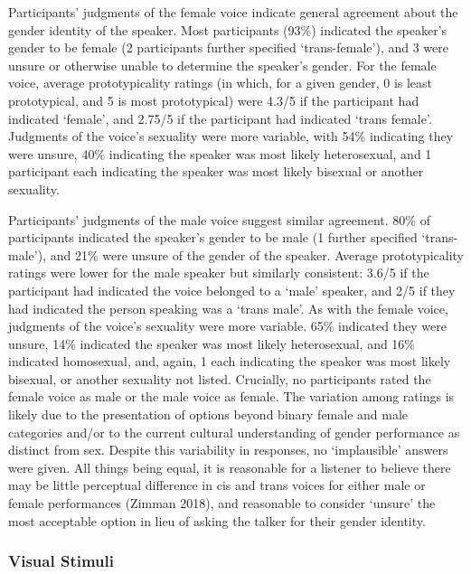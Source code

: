 \documentclass[
  letterpaper,
  DIV=11,
  numbers=noendperiod]{scrartcl}
\begin{document}
Participants' judgments of the female voice indicate general agreement
about the gender identity of the speaker. Most participants (93\%)
indicated the speaker's gender to be female (2 participants further
specified `trans-female'), and 3 were unsure or otherwise unable to
determine the speaker's gender. For the female voice, average
prototypicality ratings (in which, for a given gender, 0 is least
prototypical, and 5 is most prototypical) were 4.3/5 if the participant
had indicated `female', and 2.75/5 if the participant had indicated
`trans female'. Judgments of the voice's sexuality were more variable,
with 54\% indicating they were unsure, 40\% indicating the speaker was
most likely heterosexual, and 1 participant each indicating the speaker
was most likely bisexual or another sexuality.

Participants' judgments of the male voice suggest similar agreement.
80\% of participants indicated the speaker's gender to be male (1
further specified `trans-male'), and 21\% were unsure of the gender of
the speaker. Average prototypicality ratings were lower for the male
speaker but similarly consistent: 3.6/5 if the participant had indicated
the voice belonged to a `male' speaker, and 2/5 if they had indicated
the person speaking was a `trans male'. As with the female voice,
judgments of the voice's sexuality were more variable. 65\% indicated
they were unsure, 14\% indicated the speaker was most likely
heterosexual, and 16\% indicated homosexual, and, again, 1 each
indicating the speaker was most likely bisexual, or another sexuality
not listed. Crucially, no participants rated the female voice as male or
the male voice as female. The variation among ratings is likely due to
the presentation of options beyond binary female and male categories
and/or to the current cultural understanding of gender performance as
distinct from sex. Despite this variability in responses, no
`implausible' answers were given. All things being equal, it is
reasonable for a listener to believe there may be little perceptual
difference in cis and trans voices for either male or female
performances (Zimman 2018), and reasonable to consider `unsure' the most
acceptable option in lieu of asking the talker for their gender
identity.

\subsubsection{Visual Stimuli}\label{sec-stimuli-visual}
\end{document}

